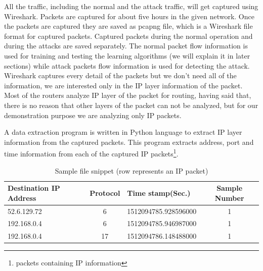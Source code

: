 \documentclass[12pt,oneside,a4paper]{article}
\begin{document}
All the traffic, including the normal and the attack traffic, will get captured using Wireshark. Packets are captured for about five hours in the given network. Once the packets are captured they are saved as pcapng file, which is a Wireshark file format for captured packets. Captured packets during the normal operation and during the attacks are saved separately. The normal packet flow information is used for training and testing the learning algorithms (we will explain it in later sections) while attack packets flow information is used for detecting the attack. Wireshark captures every detail of the packets but we don't need all of the information, we are interested only in the IP layer information of the packet. Most of the routers analyze IP layer of the packet for routing, having said that, there is no reason that other layers of the packet can not be analyzed, but for our demonstration purpose we are analyzing only IP packets.\par

A data extraction program is written in Python language to extract IP layer information from the captured packets. This program extracts address, port and time information from each of the captured IP packets\footnote{packets containing IP information}.

\begin{table}[H]
\centering
  \begin{tabular}{| l | c | l | c |}
    \hline
    Destination IP Address      & Protocol  & Time stamp(Sec.)  & Sample Number \\
    \hline
    52.6.129.72         & 6         & 1512094785.928596000  & 1 \\ \hline
    192.168.0.4         & 6         & 1512094785.946987000  & 1 \\ \hline
    192.168.0.4         & 17        & 1512094786.148488000  & 1 \\ \hline
  \end{tabular}
\caption{Sample file snippet (row represents an IP packet)} \label{table:sample-file-snippet}
\end{table}
\end{document}
